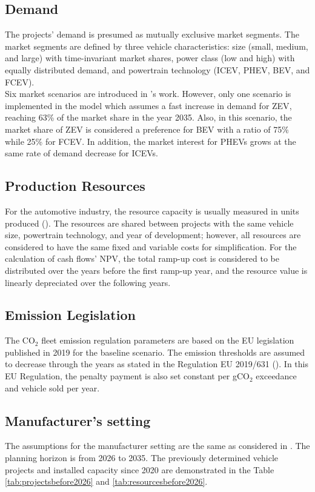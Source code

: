 \subsection{Demand}\label{demand}
The projects' demand is presumed as mutually exclusive market segments. The market segments are defined by three vehicle characteristics: size (small, medium, and large) with time-invariant market shares, power class (low and high) with equally distributed demand, and powertrain technology (\gls{ICEV}, \gls{PHEV}, \gls{BEV}, and \gls{FCEV}).\\
Six market scenarios are introduced in \cite{mainreference_thies}'s work. However, only one scenario is implemented in the model which assumes a fast increase in demand for \gls{ZEV}, reaching 63\% of the market share in the year 2035. Also, in this scenario, the market share of \gls{ZEV} is considered a preference for \gls{BEV} with a ratio of 75\% while 25\% for \gls{FCEV}. In addition, the market interest for \gls{PHEV}s grows at the same rate of demand decrease for \gls{ICEV}s.\\
\subsection{Production Resources}\label{productionresources}
For the automotive industry, the resource capacity is usually measured in units produced (\cite{mainreference_thies}). The resources are shared between projects with the same vehicle size, powertrain technology, and year of development; however, all resources are considered to have the same fixed and variable costs for simplification. For the calculation of cash flows' \gls{NPV}, the total ramp-up cost is considered to be distributed over the years before the first ramp-up year, and the resource value is linearly depreciated over the following years.\\
\subsection{Emission Legislation}\label{emissionlegislation}
The $\text{CO}_{2}$ fleet emission regulation parameters are based on the EU legislation published in 2019 for the baseline scenario. The emission thresholds are assumed to decrease through the years as stated in the Regulation EU 2019/631 (\cite{european2019regulation}). In this EU Regulation, the penalty payment is also set constant per g$\text{CO}_2$ exceedance and vehicle sold per year.\\
\subsection{Manufacturer's setting}\label{manufacturerssetting}
The assumptions for the manufacturer setting are the same as considered in \cite{mainreference_thies}. The planning horizon is from 2026 to 2035. The previously determined vehicle projects and installed capacity since 2020 are demonstrated in the Table \ref{tab:projectsbefore2026} and \ref{tab:resourcesbefore2026}.\\
